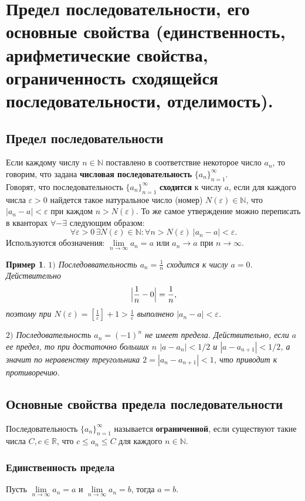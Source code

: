 \documentclass[12pt]{article}
\newtheorem{example}[theorem]{Пример}
\theoremstyle{definition}
\begin{document}
\section{Предел последовательности, его основные свойства (единственность, арифметические свойства, ограниченность сходящейся последовательности, отделимость).}
\subsection{Предел последовательности}
Если каждому числу $n\in \mathbb{N}$ поставлено в соответствие некоторое число $a_n$, то говорим, что задана {\bf числовая последовательность} $\{a_n\}_{n=1}^\infty$. \\
Говорят, что последовательность $\{a_n\}_{n=1}^\infty$
{\bf сходится} к числу $a$,
если
для каждого числа $\varepsilon>0$
найдется такое натуральное число (номер) $N(\varepsilon)\in \mathbb{N}$,
что $|a_n - a|<\varepsilon$ при каждом $n>N(\varepsilon)$.
То же самое утверждение можно переписать в кванторах $\forall-\exists$
следующим образом:
$$
\forall\varepsilon>0\, \exists N(\varepsilon)\in \mathbb{N}\colon \forall n>N(\varepsilon)\ |a_n-a|<\varepsilon.
$$
Используются обозначения: $\lim\limits_{n\to\infty}a_n=a$ или $a_n\to a$ при $n\to \infty$.

\begin{example}
$1)$ Последоввательность $a_n=\frac{1}{n}$ сходится к числу $a=0$.
Действительно
$$
\Bigl|\frac{1}{n} - 0\Bigr|= \frac{1}{n},
$$
поэтому при $N(\varepsilon)=[\frac{1}{\varepsilon}]+1>\frac{1}{\varepsilon}$ выполнено
$|a_n-a|<\varepsilon$.


$2)$ Последовательность $a_n = (-1)^n$ не имеет предела.
Действительно, если $a$ ее предел, то при достаточно больших $n$
$|a-a_n|<1/2$ и $|a-a_{n+1}|<1/2$, а значит по неравенству треугольника
$2=|a_n - a_{n+1}|<1$, что приводит к противоречию.
\end{example}
\subsection{Основные свойства предела последовательности}
Последовательность $\{a_n\}_{n=1}^\infty$
называется {\bf ограниченной}, если существуют такие числа
$C,c\in \mathbb{R}$, что $c\le a_n\le C$ для каждого $n\in \mathbb{N}$.

\subsubsection{Единственность предела}
Пусть $\lim\limits_{n\to\infty}a_n = a$
и $\lim\limits_{n\to\infty}a_n = b$,
тогда $a=b$.
\end{document}
